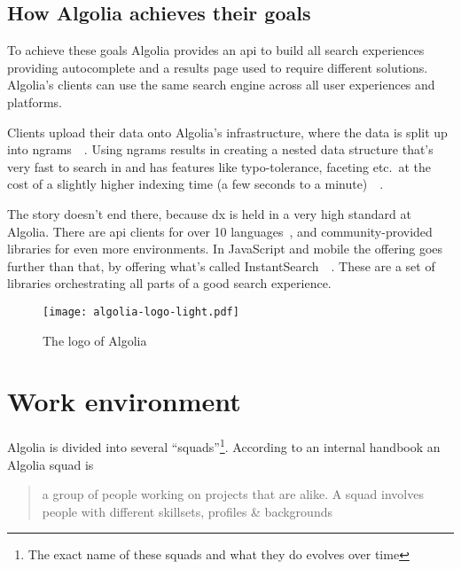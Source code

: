 \subsection{How Algolia achieves their goals}

To achieve these goals Algolia provides an \acrshort{api} to build all search experiences providing autocomplete and a results page used to require different solutions. Algolia's clients can use the same search engine across all user experiences and platforms.


Clients upload their data onto Algolia's infrastructure, where the data is split up into \glspl{ngram}~\cite{kimbrell1988searching}~. Using \glspl{ngram} results in creating a nested data structure that’s very fast to search in and has features like typo-tolerance, faceting etc.\ at the cost of a slightly higher indexing time (a few seconds to a minute)~\cite{paris-nlp-algolia}~.

The story doesn't end there, because \acrfull{dx} is held in a very high standard at Algolia. There are \acrshort{api} clients for over 10 languages~\cite{doc-api-clients}, and community-provided libraries for even more environments. In JavaScript and mobile the offering goes further than that, by offering what’s called InstantSearch~\cite{instantsearch-js, react-instantsearch, instantsearch-android, instantsearch-ios}~. These are a set of libraries orchestrating all parts of a good search experience.

\begin{figure}[H]
  \centering
  \texttt{[image: algolia-logo-light.pdf]}
  \caption{The logo of Algolia~\cite{algolia-press}}
  \label{figure:company-logo}
\end{figure}

\section{Work environment}
\label{sec:work-environment}

Algolia is divided into several ``squads''\footnote{The exact name of these squads and what they do evolves over time}. According to an internal handbook an Algolia squad is

\begin{quotation}
  a group of people working on projects that are alike. A squad involves people with different skillsets, profiles \& backgrounds
\end{quotation}

